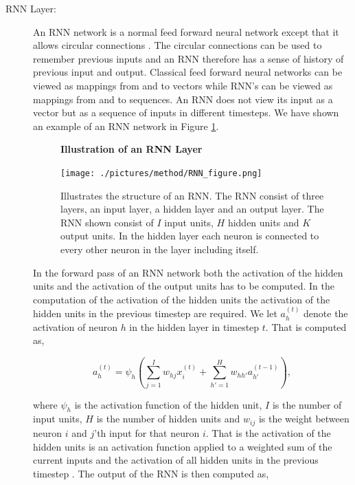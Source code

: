 \begin{description}
    \item[\gls{RNN} Layer:]

        An RNN network is a normal feed forward neural network except that
        it allows circular connections \citep{DBLP:series/sci/2012-385}. The
        circular connections can be used to remember previous inputs and an
        \gls{RNN} therefore has a sense of history of previous input and output.
        Classical feed forward neural networks can be viewed as mappings from
        and to vectors while \gls{RNN}'s can be viewed as mappings from and to
        sequences. An \gls{RNN} does not view its input as a vector but as a
        sequence of inputs in different timesteps. We have shown an example of
        an \gls{RNN} network in Figure \ref{fig:rnn_illustration}.

        \begin{figure}
            \centering
            \textbf{Illustration of an \gls{RNN} Layer}\par\medskip
            \texttt{[image: ./pictures/method/RNN\_figure.png]}
            \caption{Illustrates the structure of an \gls{RNN}. The \gls{RNN}
                consist of three layers, an input layer, a hidden layer and an
                output layer. The \gls{RNN} shown consist of $I$ input units,
                $H$ hidden units and $K$ output units. In the hidden layer each
                neuron is connected to every other neuron in the layer including
                itself.}
            \label{fig:rnn_illustration}
        \end{figure}

        In the forward pass of an \gls{RNN} network both the activation of the
        hidden units and the activation of the output units has to be computed.
        In the computation of the activation of the hidden units the activation
        of the hidden units in the previous timestep are required. We let
        $a^{(t)}_h$ denote the activation of neuron $h$ in the hidden layer in
        timestep $t$. That is computed as,

        \begin{equation}
            a^{(t)}_h = \psi_h\left(
                \sum_{j=1}^I w_{hj} x^{(t)}_i +
                \sum_{h'=1}^H w_{hh'} a^{(t-1)}_{h'}
            \right),
        \end{equation}

        where $\psi_h$ is the activation function of the hidden unit, $I$ is the
        number of input units, $H$ is the number of hidden units and $w_{ij}$ is
        the weight between neuron $i$ and $j$'th input for that neuron $i$. That
        is the activation of the hidden units is an activation function applied
        to a weighted sum of the current inputs and the activation of all hidden
        units in the previous timestep \citep{DBLP:series/sci/2012-385}. The
        output of the \gls{RNN} is then computed as,


\end{description}
